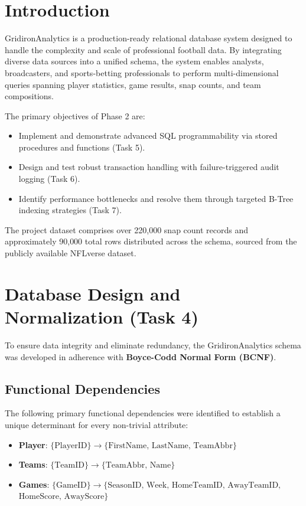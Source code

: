 \documentclass[conference]{IEEEtran}
\begin{document}
\section{Introduction}

GridironAnalytics is a production-ready relational database system designed to handle the complexity and scale of professional football data. By integrating diverse data sources into a unified schema, the system enables analysts, broadcasters, and sports-betting professionals to perform multi-dimensional queries spanning player statistics, game results, snap counts, and team compositions.

The primary objectives of Phase 2 are:
\begin{itemize}
  \item Implement and demonstrate advanced SQL programmability via stored procedures and functions (Task 5).
  \item Design and test robust transaction handling with failure-triggered audit logging (Task 6).
  \item Identify performance bottlenecks and resolve them through targeted B-Tree indexing strategies (Task 7).
\end{itemize}

The project dataset comprises over 220{,}000 snap count records and approximately 90{,}000 total rows distributed across the schema, sourced from the publicly available NFLverse dataset.

\section{Database Design and Normalization (Task 4)}

To ensure data integrity and eliminate redundancy, the GridironAnalytics schema was developed in adherence with \textbf{Boyce-Codd Normal Form (BCNF)}.

\subsection{Functional Dependencies}

The following primary functional dependencies were identified to establish a unique determinant for every non-trivial attribute:

\begin{itemize}
  \item \textbf{Player}: $\{\text{PlayerID}\} \rightarrow \{\text{FirstName, LastName, TeamAbbr}\}$
  \item \textbf{Teams}: $\{\text{TeamID}\} \rightarrow \{\text{TeamAbbr, Name}\}$
  \item \textbf{Games}: $\{\text{GameID}\} \rightarrow \{\text{SeasonID, Week, HomeTeamID, AwayTeamID,}$\\$\text{HomeScore, AwayScore}\}$
\end{itemize}
\end{document}
